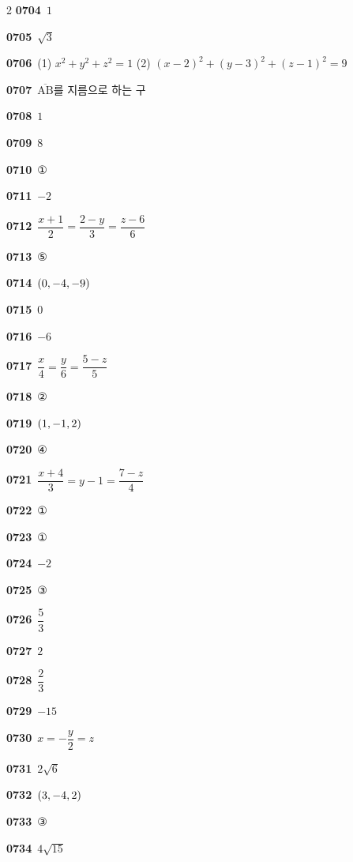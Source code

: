 \documentclass[10pt,a4paper]{article}
\newcommand{\seg}[1]{\overline{\mathrm{#1}}}
\begin{document}
\begin{multicols}{2}
\noindent\textbf{0704}\ $1$\par
\noindent\textbf{0705}\ $\sqrt{3}$\par
\noindent\textbf{0706}\ (1) $x^2+y^2+z^2=1$ \enspace (2) $(x-2)^2+(y-3)^2+(z-1)^2=9$\par
\noindent\textbf{0707}\ $\seg{AB}$를 지름으로 하는 구\par
\noindent\textbf{0708}\ $1$\par
\noindent\textbf{0709}\ $8$\par
\noindent\textbf{0710}\ ①\par
\noindent\textbf{0711}\ $-2$\par
\noindent\textbf{0712}\ $\dfrac{x+1}{2}=\dfrac{2-y}{3}=\dfrac{z-6}{6}$\par
\noindent\textbf{0713}\ ⑤\par
\noindent\textbf{0714}\ $(0{,}\mkern3mu\mathopen{}-4{,}\mkern3mu\mathopen{}-9)$\par
\noindent\textbf{0715}\ $0$\par
\noindent\textbf{0716}\ $-6$\par
\noindent\textbf{0717}\ $\dfrac{x}{4}=\dfrac{y}{6}=\dfrac{5-z}{5}$\par
\noindent\textbf{0718}\ ②\par
\noindent\textbf{0719}\ $(1{,}\mkern3mu\mathopen{}-1{,}\mkern3mu\mathopen{}2)$\par
\noindent\textbf{0720}\ ④\par
\noindent\textbf{0721}\ $\dfrac{x+4}{3}=y-1=\dfrac{7-z}{4}$\par
\noindent\textbf{0722}\ ①\par
\noindent\textbf{0723}\ ①\par
\noindent\textbf{0724}\ $-2$\par
\noindent\textbf{0725}\ ③\par
\noindent\textbf{0726}\ $\dfrac{5}{3}$\par
\noindent\textbf{0727}\ $2$\par
\noindent\textbf{0728}\ $\dfrac{2}{3}$\par
\noindent\textbf{0729}\ $-15$\par
\noindent\textbf{0730}\ $x=-\dfrac{y}{2}=z$\par
\noindent\textbf{0731}\ $2\sqrt{6}$\par
\noindent\textbf{0732}\ $(3{,}\mkern3mu\mathopen{}-4{,}\mkern3mu\mathopen{}2)$\par
\noindent\textbf{0733}\ ③\par
\noindent\textbf{0734}\ $4\sqrt{15}$\par

\end{multicols}
\end{document}
